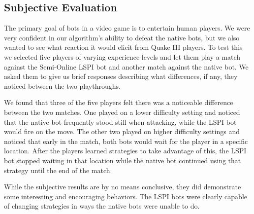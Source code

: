 \subsection{Subjective Evaluation}

The primary goal of bots in a video game is to entertain human players. We were very confident in our algorithm's ability to defeat the native bots, but we also wanted to see what reaction it would elicit from Quake III players. To test this we selected five players of varying experience levels and let them play a match against the Semi-Online LSPI bot and another match against the native bot. We asked them to give us brief responses describing what differences, if any, they noticed between the two playthroughs.

We found that three of the five players felt there was a noticeable difference between the two matches. One played on a lower difficulty setting and noticed that the native bot frequently stood still when attacking, while the LSPI bot would fire on the move. The other two played on higher difficulty settings and noticed that early in the match, both bots would wait for the player in a specific location. After the players learned strategies to take advantage of this, the LSPI bot stopped waiting in that location while the native bot continued using that strategy until the end of the match.

While the subjective results are by no means conclusive, they did demonstrate some interesting and encouraging behaviors. The LSPI bots were clearly capable of changing strategies in ways the native bots were unable to do.